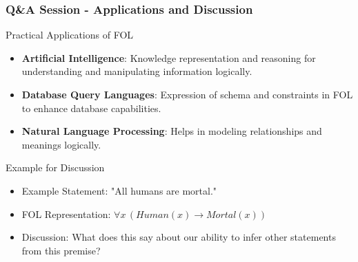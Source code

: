 \documentclass[aspectratio=169]{beamer}
\begin{document}
\begin{frame}[fragile]
  \frametitle{Q\&A Session - Applications and Discussion}
  \begin{block}{Practical Applications of FOL}
    \begin{itemize}
      \item \textbf{Artificial Intelligence}: Knowledge representation and reasoning for understanding and manipulating information logically.
      \item \textbf{Database Query Languages}: Expression of schema and constraints in FOL to enhance database capabilities.
      \item \textbf{Natural Language Processing}: Helps in modeling relationships and meanings logically.
    \end{itemize}
  \end{block}
  
  \begin{block}{Example for Discussion}
    \begin{itemize}
      \item Example Statement: "All humans are mortal." 
      \item FOL Representation: $\forall x \, (Human(x) \rightarrow Mortal(x))$
      \item Discussion: What does this say about our ability to infer other statements from this premise?
    \end{itemize}
  \end{block}
\end{frame}
\end{document}
